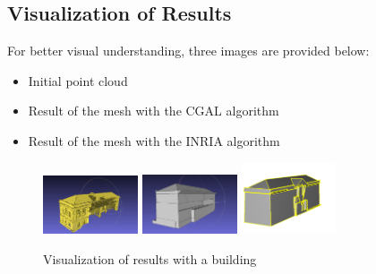 \documentclass{article}
\begin{document}
\subsection{Visualization of Results}

For better visual understanding, three images are provided below:

\begin{itemize}
    \item Initial point cloud
    \item Result of the mesh with the CGAL algorithm
    \item Result of the mesh with the INRIA algorithm
\end{itemize}

\vspace{0.5cm}
\begin{figure}[h]
\centering
\includegraphics[width=0.25\textwidth]{../../images/screen_kinetic/building_point.png}
\hspace{0.05\textwidth}
\includegraphics[width=0.25\textwidth]{../../images/screen_kinetic/building_cgal.png}
\hspace{0.05\textwidth}
\includegraphics[width=0.25\textwidth]{../../images/screen_kinetic/building_inria.png}
\caption{Visualization of results with a building}
\end{figure}
\end{document}
